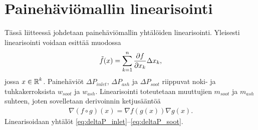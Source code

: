 
\chapter{Painehäviömallin linearisointi}%
\label{ch:linearisointi}

Tässä liitteessä johdetaan painehäviömallin yhtälöiden linearisointi. Yleisesti linearisointi voidaan esittää muodossa
\begin{align}
    \tilde{f}(x) = \sum_{k=1}^n \frac{\partial f}{\partial x_k}\Delta x_k,
\end{align}
jossa \(x \in \operatorname{\mathbb{R}}^k\). 
Painehäviöt \(\Delta P_{inlet}\), \(\Delta P_{ash}\) ja \(\Delta P_{soot}\) riippuvat noki- ja tuhkakerroksista \(w_{soot}\) ja \(w_{ash}\). 
Linearisointi toteutetaan muuttujien \(m_{soot}\) ja \( m_{ash}\) suhteen, joten
sovelletaan derivoinnin ketjusääntöä
\begin{align}
    \nabla (f \circ g)(x) = \nabla f(g(x))\nabla g(x).
\end{align}
Linearisoidaan  yhtälöt \eqref{eq:deltaP_inlet}--\eqref{eq:deltaP_soot}.




